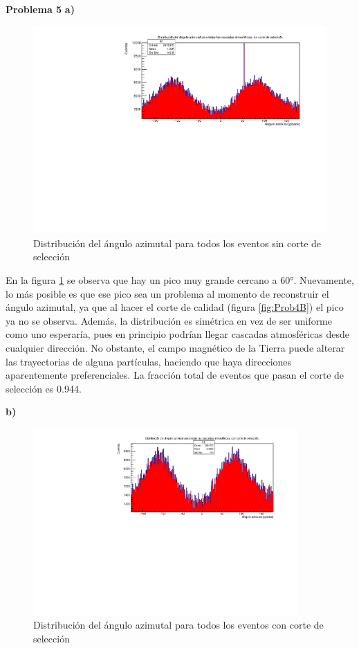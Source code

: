 \documentclass[11pt]{article}
\begin{document}
\textbf{Problema 5}
\textbf{a)}
\begin{figure}[H]
\centering
\includegraphics[width=1\textwidth]{../Figuras/Prob5A}
\caption{Distribución del ángulo azimutal para todos los eventos sin corte de selección}
\label{fig:Prob5A}
\end{figure}
En la figura \ref{fig:Prob5A} se observa que hay un pico muy grande cercano a 60°. Nuevamente, lo más posible es que ese pico sea un problema al momento de reconstruir el ángulo azimutal, ya que al hacer el corte de calidad (figura \ref{fig:Prob4B}) el pico ya no se observa. Además, la distribución es simétrica en vez de ser uniforme como uno esperaría, pues en principio podrían llegar cascadas atmosféricas desde cualquier dirección. No obstante, el campo magnético de la Tierra puede alterar las trayectorias de alguna partículas, haciendo que haya direcciones aparentemente preferenciales. La fracción total de eventos que pasan el corte de selección es 0.944. 

\textbf{b)}
\begin{figure}[H]
\centering
\includegraphics[width=0.9\textwidth]{../Figuras/Prob5B}
\caption{Distribución del ángulo azimutal para todos los eventos con corte de selección}
\label{fig:Prob5B}
\end{figure}
\end{document}
